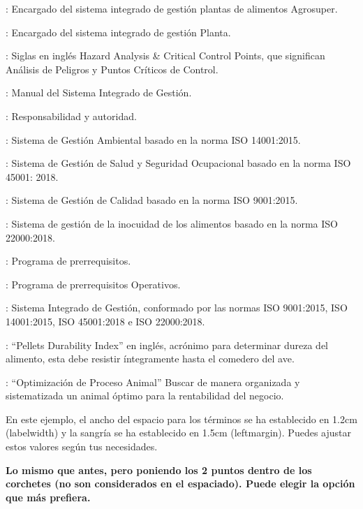 \begin{description}[labelwidth=1.2cm, leftmargin=1.5cm]
\item[ESIG]: Encargado del sistema integrado de gestión plantas de alimentos Agrosuper.
\item[EPS]: Encargado del sistema integrado de gestión Planta.
\item[HACCP]: Siglas en inglés Hazard Analysis \& Critical Control Points, que significan Análisis de Peligros y Puntos Críticos de Control.
\item[MSIG]: Manual del Sistema Integrado de Gestión.
\item[R\&A]: Responsabilidad y autoridad.
\item[SGA]: Sistema de Gestión Ambiental basado en la norma ISO 14001:2015.
\item[SGS]: Sistema de Gestión de Salud y Seguridad Ocupacional basado en la norma ISO 
 45001: 2018.
\item[SGC]: Sistema de Gestión de Calidad basado en la norma ISO 9001:2015.
\item[SGIA]: Sistema de gestión de la inocuidad de los alimentos basado en la norma ISO 
 22000:2018.
\item[PPR]: Programa de prerrequisitos.
\item[PPRO]: Programa de prerrequisitos Operativos.
\item[SIG]: Sistema Integrado de Gestión, conformado por las normas ISO 9001:2015, ISO 
 14001:2015, ISO 45001:2018 e ISO 22000:2018.
\item[PDI]: “Pellets Durability Index” en inglés, acrónimo para determinar dureza del alimento, esta debe resistir íntegramente hasta el comedero del ave. 
\item[OPA]: “Optimización de Proceso Animal” Buscar de manera organizada y sistematizada 
 un animal óptimo para la rentabilidad del negocio.
\end{description}

En este ejemplo, el ancho del espacio para los términos se ha establecido en 1.2cm (labelwidth) y la sangría se ha establecido en 1.5cm (leftmargin). Puedes ajustar estos valores según tus necesidades.

\textbf{Lo mismo que antes, pero poniendo los 2 puntos dentro de los corchetes (no son considerados en el espaciado). Puede elegir la opción que más prefiera.}

